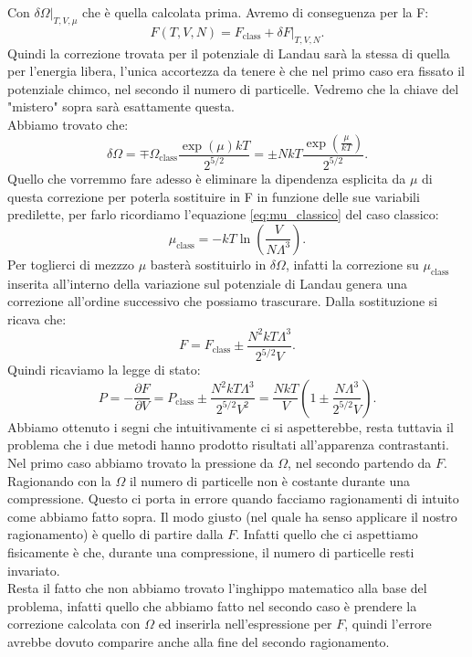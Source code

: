 Con $\left.\delta \Omega \right|_{T,V, \mu}$ che è quella calcolata prima. Avremo di conseguenza per la F:
\[
	F( T,V,N) = F_{\text{class}} + \left.\delta F\right|_{T,V,N}
.\] 
Quindi la correzione trovata per il potenziale di Landau sarà la stessa di quella per l'energia libera, l'unica accortezza da tenere è che nel primo caso era fissato il potenziale chimco, nel secondo il numero di particelle. Vedremo che la chiave del "mistero" sopra sarà esattamente questa.\\
Abbiamo trovato che:
\[
	\delta \Omega = \mp \Omega _{\text{class}}\frac{\exp\left( \mu  \right)kT }{2^{5 / 2}} = \pm NkT \frac{\exp\left( \frac{\mu }{kT} \right) }{2 ^{5 /2}}
.\] 
Quello che vorremmo fare adesso è eliminare la dipendenza esplicita da $\mu $ di questa correzione per poterla sostituire in F in funzione delle sue variabili predilette, per farlo ricordiamo l'equazione \ref{eq:mu_classico} del caso classico:
\[
	\mu _{\text{class}} = -kT \ln\left( \frac{V}{N\Lambda ^3} \right) 
.\] 
Per toglierci di mezzzo $\mu $ basterà sostituirlo in $\delta \Omega $, infatti la correzione su $\mu _{\text{class}}$ inserita all'interno della variazione sul potenziale di Landau genera una correzione all'ordine successivo che possiamo trascurare. Dalla sostituzione si ricava che:
\[
	F = F_{\text{class}} \pm \frac{N^2kT\Lambda ^3}{2^{5 /2}V}
.\] 
Quindi ricaviamo la legge di stato:
\[
	P = - \frac{\partial F}{\partial V} = P_{\text{class}} \pm \frac{N^2kT\Lambda ^3}{2^{5 /2}V^2} = \frac{NkT}{V}\left( 1 \pm \frac{N\Lambda ^3}{2^{5 /2}V} \right) 
.\] 
Abbiamo ottenuto i segni che intuitivamente ci si aspetterebbe, resta tuttavia il problema che i due metodi hanno prodotto risultati all'apparenza contrastanti.\\
Nel primo caso abbiamo trovato la pressione da $\Omega $, nel secondo partendo da $F$. Ragionando con la $\Omega $ il numero di particelle non è costante durante una compressione. Questo ci porta in errore quando facciamo ragionamenti di intuito come abbiamo fatto sopra. Il modo giusto (nel quale ha senso applicare il nostro ragionamento) è quello di partire dalla $F$. Infatti quello che ci aspettiamo fisicamente è che, durante una compressione, il numero di particelle resti invariato.\\
Resta il fatto che non abbiamo trovato l'inghippo matematico alla base del problema, infatti quello che abbiamo fatto nel secondo caso è prendere la correzione calcolata con $\Omega $ ed inserirla nell'espressione per $F$, quindi l'errore avrebbe dovuto comparire anche alla fine del secondo ragionamento.\\ 
